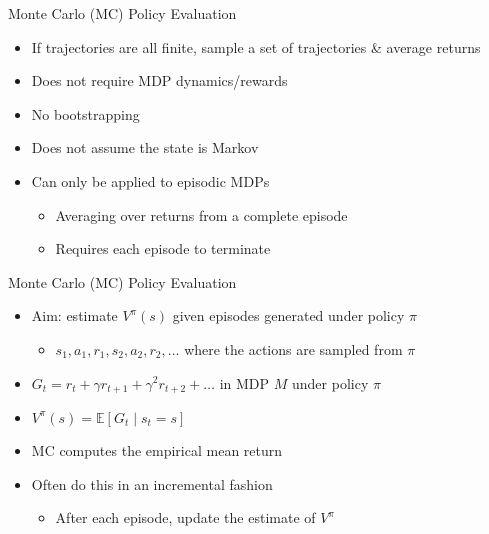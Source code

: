 \documentclass[aspectratio=169]{../latex_main/tntbeamer}  %
\begin{document}
\begin{frame}[c]{Monte Carlo (MC) Policy Evaluation}

\begin{itemize}
	\item If trajectories are all finite, sample a set of trajectories \& average returns
	\item Does \alert{not} require MDP dynamics/rewards
	\item No bootstrapping
	\item Does not assume the state is Markov
	\item Can only be applied to episodic MDPs
	\begin{itemize}
		\item Averaging over returns from a complete episode
		\item Requires each episode to terminate
	\end{itemize}
\end{itemize}

\end{frame}
\begin{frame}[c]{Monte Carlo (MC) Policy Evaluation}

\begin{itemize}
	\item Aim: estimate $V^\pi (s)$ given episodes generated under policy $\pi$
	\begin{itemize}
		\item $s_1, a_1, r_1, s_2, a_2, r_2, \ldots$ where the actions are sampled from $\pi$
	\end{itemize}
	\item $G_t = r_t + \gamma r_{t+1} + \gamma^2 r_{t+2} + \ldots$ in MDP $M$ under policy $\pi$
	\item $V^\pi (s) = \mathbb{E} [G_t \mid s_t = s]$
	\item MC computes the empirical mean return
	\item Often do this in an incremental fashion
	\begin{itemize}
		\item After each episode, update the estimate of $V^\pi$
	\end{itemize}
\end{itemize}

\end{frame}
\end{document}
